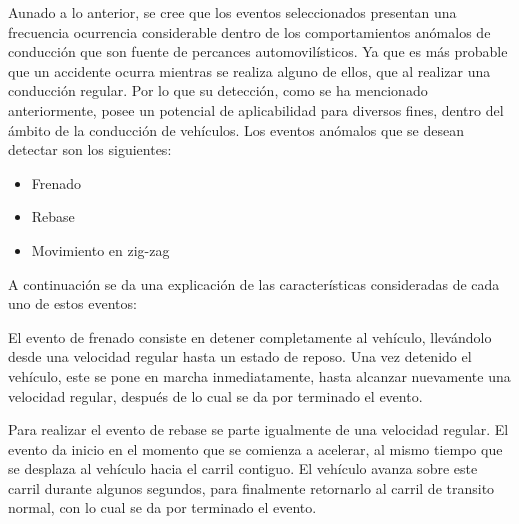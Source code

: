 Aunado a lo anterior, se cree que los eventos seleccionados presentan una frecuencia ocurrencia considerable dentro de los comportamientos anómalos de conducción que son fuente de percances automovilísticos. 
Ya que es más probable que un accidente ocurra mientras se realiza alguno de ellos, que al realizar una conducción regular.
Por lo que su detección, como se ha mencionado anteriormente, posee un potencial de aplicabilidad para diversos fines, dentro del ámbito de la conducción de vehículos. 
Los eventos anómalos que se desean detectar son los siguientes:

\begin{itemize}
\item{Frenado}
\item{Rebase}
\item{Movimiento en zig-zag}
\end{itemize}

A continuación se da una explicación de las características consideradas de cada uno de estos eventos:

El evento de frenado consiste en detener completamente al vehículo, llevándolo desde una velocidad regular hasta un estado de reposo.
Una vez detenido el vehículo, este se pone en marcha inmediatamente, hasta alcanzar nuevamente una velocidad regular, después de lo cual se da por terminado el evento.

Para realizar el evento de rebase se parte igualmente de una velocidad regular.  
El evento da inicio en el momento que se comienza a acelerar, al mismo tiempo que se desplaza al vehículo hacia el carril contiguo.
El vehículo avanza sobre este carril durante algunos segundos, para finalmente retornarlo al carril de transito normal, con lo cual se da por terminado el evento.

